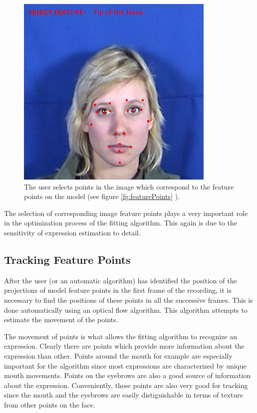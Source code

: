 \documentclass[11pt,a4paper]{report}
\begin{document}
\begin{figure}[H]
\begin{centering}
\includegraphics[scale=0.60]{images/featureSelection.png}
\par\end{centering}

\caption{The user selects points in the image which correspond to the feature
  points on the model (see figure \ref{fg:featurePoints} ).}
\label{fg:featurePoints2}

\end{figure}

The selection of corresponding image feature points plays a very important role
in the optimization process of the fitting algorithm. This again is due to the
sensitivity of expression estimation to detail.

\subsection{Tracking Feature Points}
After the user (or an automatic algorithm) has identified the position of the projections of model
feature points in the first frame of the recording, it is necessary to find
the positions of these points in all the successive frames. This is done
automatically using an optical flow algorithm. This algorithm attempts to
estimate the movement of the points.

The movement of points is what allows the fitting algorithm to recognize an
expression. Clearly there are points which provide more information about the
expression than
other. Points around the mouth for example are especially important for the
algorithm since most expressions are characterized by unique mouth
movements. Points on the eyebrows are also a good source of information about
the expression. Conveniently, these points are also very good for tracking since
the mouth and the eyebrows are easily distiguishable in terms of texture from
other points on the face. 
\end{document}
